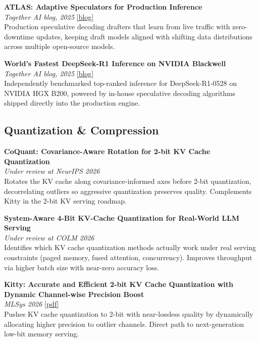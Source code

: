 \documentclass[11pt,letterpaper]{article}
\begin{document}
\vspace{6pt}
\noindent\textbf{ATLAS: Adaptive Speculators for Production Inference}\\
\textit{Together AI blog, 2025} \href{https://www.together.ai/blog/adaptive-learning-speculator-system-atlas}{[blog]}\\[2pt]
Production speculative decoding drafters that learn from live traffic with zero-downtime updates, keeping draft models aligned with shifting data distributions across multiple open-source models.

\vspace{6pt}
\noindent\textbf{World's Fastest DeepSeek-R1 Inference on NVIDIA Blackwell}\\
\textit{Together AI blog, 2025} \href{https://www.together.ai/blog/fastest-inference-for-deepseek-r1-0528-with-nvidia-hgx-b200}{[blog]}\\[2pt]
Independently benchmarked top-ranked inference for DeepSeek-R1-0528 on NVIDIA HGX B200, powered by in-house speculative decoding algorithms shipped directly into the production engine.

\subsection*{Quantization \& Compression}
\noindent\textbf{CoQuant: Covariance-Aware Rotation for 2-bit KV Cache Quantization}\\
\textit{Under review at NeurIPS 2026}\\[2pt]
Rotates the KV cache along covariance-informed axes before 2-bit quantization, decorrelating outliers so aggressive quantization preserves quality. Complements Kitty in the 2-bit KV serving roadmap.

\vspace{6pt}
\noindent\textbf{System-Aware 4-Bit KV-Cache Quantization for Real-World LLM Serving}\\
\textit{Under review at COLM 2026}\\[2pt]
Identifies which KV cache quantization methods actually work under real serving constraints (paged memory, fused attention, concurrency). Improves throughput via higher batch size with near-zero accuracy loss.

\vspace{6pt}
\noindent\textbf{Kitty: Accurate and Efficient 2-bit KV Cache Quantization with Dynamic Channel-wise Precision Boost}\\
\textit{MLSys 2026} \href{https://arxiv.org/abs/2511.18643}{[pdf]}\\[2pt]
Pushes KV cache quantization to 2-bit with near-lossless quality by dynamically allocating higher precision to outlier channels. Direct path to next-generation low-bit memory serving.
\end{document}

